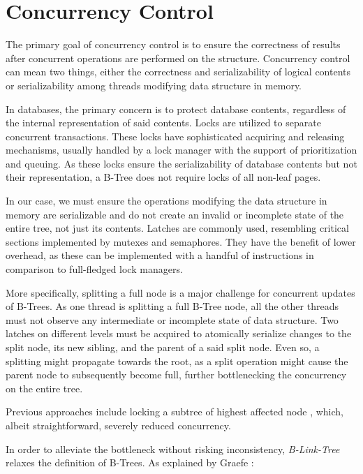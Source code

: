 \section{Concurrency Control}

The primary goal of concurrency control is to ensure the correctness of results after concurrent operations are performed on the structure. Concurrency control can mean two things, either the correctness and serializability of logical contents or serializability among threads modifying data structure in memory.

In databases, the primary concern is to protect database contents, regardless of the internal representation of said contents. Locks are utilized to separate concurrent transactions. These locks have sophisticated acquiring and releasing mechanisms, usually handled by a lock manager with the support of prioritization and queuing. As these locks ensure the serializability of database contents but not their representation, a B-Tree does not require locks of all non-leaf pages.

In our case, we must ensure the operations modifying the data structure in memory are serializable and do not create an invalid or incomplete state of the entire tree, not just its contents. Latches are commonly used, resembling critical sections implemented by mutexes and semaphores. They have the benefit of lower overhead, as these can be implemented with a handful of instructions in comparison to full-fledged lock managers.

More specifically, splitting a full node is a major challenge for concurrent updates of B-Trees. As one thread is splitting a full B-Tree node, all the other threads must not observe any intermediate or incomplete state of data structure. Two latches on different levels must be acquired to atomically serialize changes to the split node, its new sibling, and the parent of a said split node. Even so, a splitting might propagate towards the root, as a split operation might cause the parent node to subsequently become full, further bottlenecking the concurrency on the entire tree.

Previous approaches include locking a subtree of highest affected node \cite{samadi1976b}, which, albeit straightforward, severely reduced concurrency.

In order to alleviate the bottleneck without risking inconsistency, \textit{B-Link-Tree} relaxes the definition of B-Trees. As explained by Graefe \cite{goetz-tech}:

